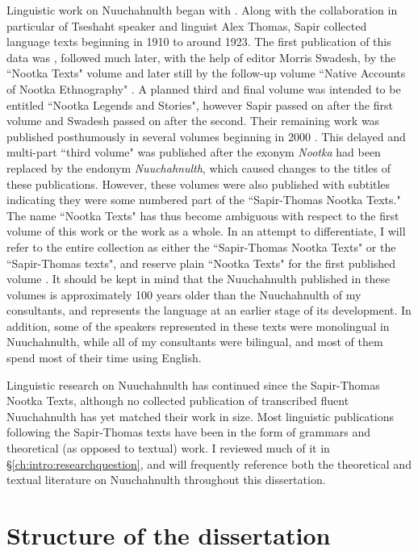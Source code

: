 Linguistic work on Nuuchahnulth began with \citet{sapir1911}. Along with the collaboration in particular of Tseshaht speaker and linguist Alex Thomas, Sapir collected language texts beginning in 1910 to around 1923. The first publication of this data was \citet{sapir1924}, followed much later, with the help of editor Morris Swadesh, by the ``Nootka Texts" volume \citep{sapir1939} and later still by the follow-up volume ``Native Accounts of Nootka Ethnography" \citep{sapir1955}. A planned third and final volume was intended to be entitled ``Nootka Legends and Stories", however Sapir passed on after the first volume and Swadesh passed on after the second. Their remaining work was published posthumously in several volumes beginning in 2000 \citep{whalingindians2000, whalingindians2004, wolfritual2007, whalingindians2009}. This delayed and multi-part ``third volume" was published after the exonym \textit{Nootka} had been replaced by the endonym \textit{Nuuchahnulth}, which caused changes to the titles of these publications. However, these volumes were also published with subtitles indicating they were some numbered part of the ``Sapir-Thomas Nootka Texts." The name ``Nootka Texts" has thus become ambiguous with respect to the first volume of this work or the work as a whole. In an attempt to differentiate, I will refer to the entire collection as either the ``Sapir-Thomas Nootka Texts" or the ``Sapir-Thomas texts", and reserve plain ``Nootka Texts" for the first published volume \citep{sapir1939}. It should be kept in mind that the Nuuchahnulth published in these volumes is approximately 100 years older than the Nuuchahnulth of my consultants, and represents the language at an earlier stage of its development. In addition, some of the speakers represented in these texts were monolingual in Nuuchahnulth, while all of my consultants were bilingual, and most of them spend most of their time using English.

Linguistic research on Nuuchahnulth has continued since the Sapir-Thomas Nootka Texts, although no collected publication of transcribed fluent Nuuchahnulth has yet matched their work in size. Most linguistic publications following the Sapir-Thomas texts have been in the form of grammars and theoretical (as opposed to textual) work. I reviewed much of it in \S\ref{ch:intro:researchquestion}, and will frequently reference both the theoretical and textual literature on Nuuchahnulth throughout this dissertation.

\section{Structure of the dissertation} \label{ch:intro:structure}

